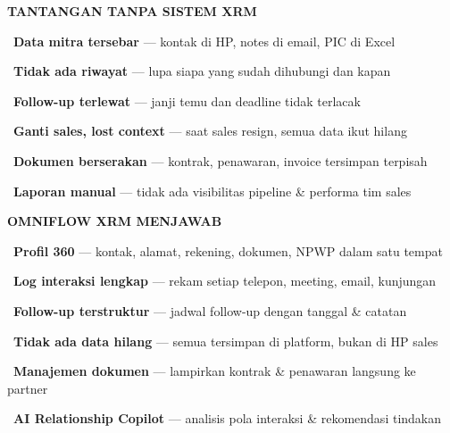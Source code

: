 \documentclass[a4paper]{article}
\begin{document}
\noindent
\begin{minipage}[t]{0.485\textwidth}
    \colorbox{RedLight}{%
        \begin{minipage}{\dimexpr\textwidth-2\fboxsep\relax}
            {\fontsize{10}{13}\selectfont\bfseries\color{RedText} TANTANGAN TANPA SISTEM XRM}
        \end{minipage}}\par
    \vspace{4pt}

    {\fontsize{9.5}{13}\selectfont\color{TextDark}%
    \textbullet\ \textbf{Data mitra tersebar} — kontak di HP, notes di email, PIC di Excel\par\vspace{4pt}%
    \textbullet\ \textbf{Tidak ada riwayat} — lupa siapa yang sudah dihubungi dan kapan\par\vspace{4pt}%
    \textbullet\ \textbf{Follow-up terlewat} — janji temu dan deadline tidak terlacak\par\vspace{4pt}%
    \textbullet\ \textbf{Ganti sales, lost context} — saat sales resign, semua data ikut hilang\par\vspace{4pt}%
    \textbullet\ \textbf{Dokumen berserakan} — kontrak, penawaran, invoice tersimpan terpisah\par\vspace{4pt}%
    \textbullet\ \textbf{Laporan manual} — tidak ada visibilitas pipeline \& performa tim sales}%
\end{minipage}%
\hfill%
\begin{minipage}[t]{0.485\textwidth}
    \colorbox{RosePrimary}{%
        \begin{minipage}{\dimexpr\textwidth-2\fboxsep\relax}
            {\fontsize{10}{13}\selectfont\bfseries\color{White} OMNIFLOW XRM MENJAWAB}
        \end{minipage}}\par
    \vspace{4pt}

    {\fontsize{9.5}{13}\selectfont\color{TextDark}%
    \textbullet\ \textbf{Profil 360\textdegree} — kontak, alamat, rekening, dokumen, NPWP dalam satu tempat\par\vspace{4pt}%
    \textbullet\ \textbf{Log interaksi lengkap} — rekam setiap telepon, meeting, email, kunjungan\par\vspace{4pt}%
    \textbullet\ \textbf{Follow-up terstruktur} — jadwal follow-up dengan tanggal \& catatan\par\vspace{4pt}%
    \textbullet\ \textbf{Tidak ada data hilang} — semua tersimpan di platform, bukan di HP sales\par\vspace{4pt}%
    \textbullet\ \textbf{Manajemen dokumen} — lampirkan kontrak \& penawaran langsung ke partner\par\vspace{4pt}%
    \textbullet\ \textbf{AI Relationship Copilot} — analisis pola interaksi \& rekomendasi tindakan}%
\end{minipage}
\end{document}
